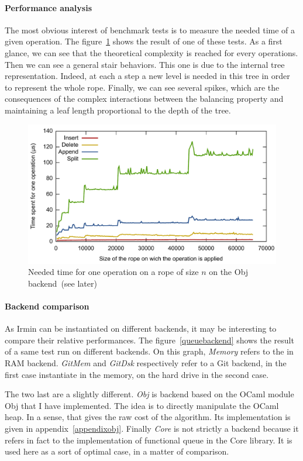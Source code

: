 \documentclass{article}
\newcommand{\irmin}{Irmin\xspace}
\newcommand{\git}{Git\xspace}
\newcommand{\ocaml}{OCaml\xspace}
\begin{document}
\paragraph{Performance analysis}
The most obvious interest of benchmark tests is to measure the needed time of a given operation.
The figure~\ref{ropeduration} shows the result of one of these tests.
As a first glance, we can see that the theoretical complexity is reached for every operations.
Then we can see a general stair behaviors.
This one is due to the internal tree representation.
Indeed, at each a step a new level is needed in this tree in order to represent the whole rope.
Finally, we can see several spikes, which are the consequences of the complex interactions between the balancing property and maintaining a leaf length proportional to the depth of the tree.

\begin{figure}[hbt]
\centering
\includegraphics[scale=0.6]{images/rope_duration.pdf}
\caption{Needed time for one operation on a rope of size $n$ on the Obj backend~(see later)}
\label{ropeduration}
\end{figure}

\paragraph{Backend comparison}
As \irmin can be instantiated on different backends, it may be interesting to compare their relative performances.
The figure~\ref{queuebackend} shows the result of a same test run on different backends.
On this graph, \emph{Memory} refers to the in RAM backend.
\emph{GitMem} and \emph{GitDsk} respectively refer to a \git backend, in the first case instantiate in the memory, on the hard drive in the second case.

The two last are a slightly different.
\emph{Obj} is backend based on the \ocaml module Obj that I have implemented.
The idea is to directly manipulate the \ocaml heap.
In a sense, that gives the raw cost of the algorithm.
Its implementation is given in appendix~\ref{appendixobj}.
Finally \emph{Core} is not strictly a backend because it refers in fact to the implementation of functional queue in the Core library.
It is used here as a sort of optimal case, in a matter of comparison.
\end{document}
